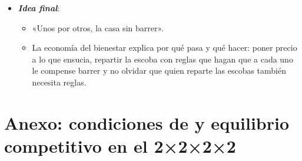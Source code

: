 \documentclass[11pt]{article}
\begin{document}
\begin{itemize}
\item \textbf{\emph{Idea final}}:
  \begin{itemize}
  \item «Unos por otros, la casa sin barrer».

  \item La economía del bienestar explica por qué pasa y qué hacer: poner precio a lo que ensucia, repartir la escoba con reglas que hagan que a cada uno le compense barrer y no olvidar que quien reparte las escobas también necesita reglas.
  \end{itemize}
\end{itemize}

\clearpage
\appendix

\section{Anexo: condiciones de  y equilibrio competitivo\cortetitulo{} en el 2×2×2×2}\label{anexo:condiciones-2x2}
\end{document}
